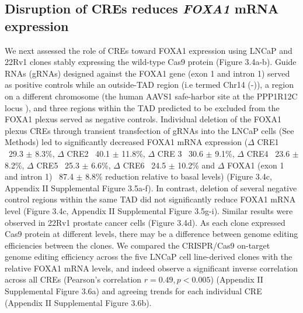 
\subsection{Disruption of CREs reduces \emph{FOXA1} mRNA expression}

We next assessed the role of CREs toward FOXA1 expression using LNCaP and 22Rv1 clones stably expressing the wild-type Cas9 protein (Figure 3.4a-b).
Guide RNAs (gRNAs) designed against the FOXA1 gene (exon 1 and intron 1) served as positive controls while an outside-TAD region (i.e termed Chr14 (-)), a region on a different chromosome (the human AAVS1 safe-harbor site at the PPP1R12C locus \cite{kronTMPRSS2ERGFusion2017,dekelverFunctionalGenomicsProteomics2010}), and three regions within the TAD predicted to be excluded from the FOXA1 plexus served as negative controls.
Individual deletion of the FOXA1 plexus CREs through transient transfection of gRNAs into the LNCaP cells (See Methods) led to significantly decreased FOXA1 mRNA expression ($\Delta$ CRE1 ~29.3 $\pm$ 8.3\%, $\Delta$ CRE2 ~40.1 $\pm$ 11.8\%, $\Delta$ CRE 3 ~30.6 $\pm$ 9.1\%, $\Delta$ CRE4 ~23.6 $\pm$ 8.2\%, $\Delta$ CRE5 ~25.3 $\pm$ 6.6\%, $\Delta$ CRE6 ~24.5 $\pm$ 10.2\% and $\Delta$ FOXA1 (exon 1 and intron 1) ~87.4 $\pm$ 8.8\% reduction relative to basal levels) (Figure 3.4c, Appendix II Supplemental Figure 3.5a-f).
In contrast, deletion of several negative control regions within the same TAD did not significantly reduce FOXA1 mRNA level (Figure 3.4c, Appendix II Supplemental Figure 3.5g-i).
Similar results were observed in 22Rv1 prostate cancer cells (Figure 3.4d).
As each clone expressed Cas9 protein at different levels, there may be a difference between genome editing efficiencies between the clones.
We compared the CRISPR/Cas9 on-target genome editing efficiency across the five LNCaP cell line-derived clones with the relative FOXA1 mRNA levels, and indeed observe a significant inverse correlation across all CREs (Pearson’s correlation $r = 0.49, p < 0.005$) (Appendix II Supplemental Figure 3.6a) and agreeing trends for each individual CRE (Appendix II Supplemental Figure 3.6b).

